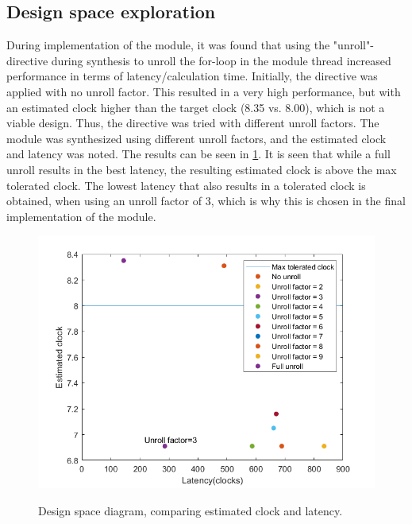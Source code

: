 \subsection{Design space exploration}
\label{sec:design_space_exploration}
During implementation of the module, it was found that using the "unroll"-directive during synthesis to unroll the for-loop in the module thread increased performance in terms of latency/calculation time. Initially, the directive was applied with no unroll factor. This resulted in a very high performance, but with an estimated clock higher than the target clock (8.35 vs. 8.00), which is not a viable design. Thus, the directive was tried with different unroll factors. The module was synthesized using different unroll factors, and the estimated clock and latency was noted. The results can be seen in \cref{fig:design_space_diagram}. It is seen that while a full unroll results in the best latency, the resulting estimated clock is above the max tolerated clock. The lowest latency that also results in a tolerated clock is obtained, when using an unroll factor of 3, which is why this is chosen in the final implementation of the module.
\begin{figure}[H]
	\centering
	{\includegraphics[width=\textwidth/2]{Images/paerto_latency_clock.PNG}}\\[0.5cm]
	\caption{Design space diagram, comparing estimated clock and latency.}
	\label{fig:design_space_diagram}
\end{figure}